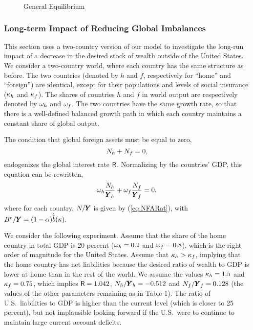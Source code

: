 \documentclass[titlepage,abstract,letterpaper]{econtex}
\renewcommand{\GDPLev}{\ensuremath{\pmb{Y}}}
\begin{document}
\medskip

\begin{figure}
\caption{General Equilibrium}\label{fig:genEqbm}
\end{figure}

\medskip

\subsubsection{Long-term Impact of Reducing Global Imbalances}

This section uses a two-country version of our model to investigate the long-run impact of a decrease in the desired stock of wealth outside of the United States. We consider a two-country world, where each country has the same structure as before. The two countries (denoted by $h$ and $f$, respectively for ``home'' and ``foreign'') are identical, except for their populations and levels of social insurance ($\kappa_h$ and $\kappa_f$). The shares of countries $h$ and $f$ in world output are respectively denoted by $\omega_h$ and $\omega_f$. The two countries have the same growth rate, so that there is a well-defined balanced growth path in which each country maintains a constant share of global output.

The condition that global foreign assets must be equal to zero,
\begin{equation*}
N_h+N_f=0,
\end{equation*}
endogenizes the global interest rate $\mathsf{R}$. Normalizing by the countries' GDP, this equation can be rewritten,
\begin{equation*}
\weight_h \frac{\NFALev_h}{\GDPLev_h}+\weight_f \frac{\NFALev_f}{\GDPLev_f}=0,
\end{equation*}
where for each country, $\NFALev/\GDPLev$ is given by (\ref{eq:NFARat}), with $\BLevE/\GDPLev=(1-\kapShare)\Alt{\bTarg}(\Severance)$.

We consider the following experiment. Assume that the share of the
home country in total GDP is 20 percent ($\omega_h=0.2$ and
$\omega_f=0.8$), which is the right order of magnitude for the United
States. Assume that $\kappa_h > \kappa_f$, implying that the home
country has net liabilities because the desired ratio of wealth to GDP
is lower at home than in the rest of the world. We assume the values
$\kappa_h=1.5$ and $\kappa_f=0.75$, which implies $\mathsf{R}=1.042$,
$\NFALev_h/\GDPLev_h=-0.512$ and $\NFALev_f/\GDPLev_f=0.128$ (the
values of the other parameters remaining as in Table 1). The ratio of
U.S.\ liabilities to GDP is higher than the current level (which is
closer to 25 percent), but not implausible looking forward if the
U.S.\ were to continue to maintain large current account deficits.
\end{document}
